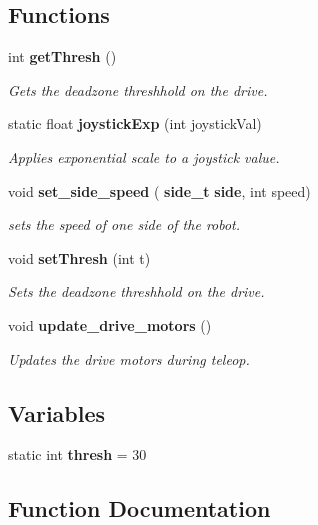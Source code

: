 \subsection*{Functions}
\begin{DoxyCompactItemize}
\item 
int \textbf{ get\+Thresh} ()
\begin{DoxyCompactList}\small\item\em Gets the deadzone threshhold on the drive. \end{DoxyCompactList}\item 
static float \textbf{ joystick\+Exp} (int joystick\+Val)
\begin{DoxyCompactList}\small\item\em Applies exponential scale to a joystick value. \end{DoxyCompactList}\item 
void \textbf{ set\+\_\+side\+\_\+speed} (\textbf{ side\+\_\+t} \textbf{ side}, int speed)
\begin{DoxyCompactList}\small\item\em sets the speed of one side of the robot. \end{DoxyCompactList}\item 
void \textbf{ set\+Thresh} (int t)
\begin{DoxyCompactList}\small\item\em Sets the deadzone threshhold on the drive. \end{DoxyCompactList}\item 
void \textbf{ update\+\_\+drive\+\_\+motors} ()
\begin{DoxyCompactList}\small\item\em Updates the drive motors during teleop. \end{DoxyCompactList}\end{DoxyCompactItemize}
\subsection*{Variables}
\begin{DoxyCompactItemize}
\item 
static int \textbf{ thresh} = 30
\end{DoxyCompactItemize}


\subsection{Function Documentation}
\mbox{\label{drive_8c_a9caa5e772598f9182c9ec84cf8c351ee}} 
